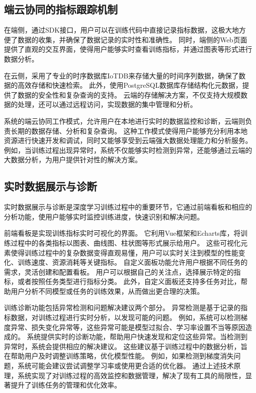 \subsection{端云协同的指标跟踪机制}

在端侧，通过SDK接口，用户可以在训练代码中直接记录指标数据，这极大地方便了数据的收集，并确保了数据记录的实时性和准确性。
同时，端侧的Web页面提供了直观的交互界面，使得用户能够实时查看训练指标，并通过图表等形式进行数据分析。

在云侧，采用了专业的时序数据库IoTDB来存储大量的时间序列数据，确保了数据的高效存储和快速检索。
此外，使用PostgreSQL数据库存储结构化元数据，提供了数据的安全性和复杂查询的支持。
云端的存储解决方案，不仅支持大规模数据的处理，还可以通过远程访问，实现数据的集中管理和分析。

系统的端云协同工作模式，允许用户在本地进行实时的数据监控和诊断，云端则负责长期的数据存储、分析和复杂查询。
这种工作模式使得用户能够充分利用本地资源进行快速开发和调试，同时又能够享受到云端强大数据处理能力和分析服务。
例如，当训练过程出现异常时，系统不仅能够实时检测到异常，还能够通过云端的大数据分析，为用户提供针对性的解决方案。

\subsection{实时数据展示与诊断}

实时数据展示与诊断是深度学习训练过程中的重要环节，它通过前端看板和相应的分析功能，使用户能够实时监控训练进度，快速识别和解决问题。

前端看板是实现训练指标实时可视化的界面。
它利用Vue框架和Echarts库，将训练过程中的各类指标以图表、曲线图、柱状图等形式展示给用户。
这些可视化元素使得训练过程中的复杂数据变得直观易懂，用户可以实时关注到模型的性能变化、训练速度、资源消耗等关键指标。
自定义面板功能允许用户根据不同任务的需求，灵活创建和配置看板。
用户可以根据自己的关注点，选择展示特定的指标，或者按照任务类型进行指标分类。
此外，自定义面板还支持多任务对比，帮助用户分析不同模型或任务的训练效果，从而做出更合理的决策。

训练诊断功能包括异常检测和问题解决建议两个部分。
异常检测是基于记录的指标数据，对训练过程进行实时分析，以发现可能的问题。
例如，系统可以检测梯度异常、损失变化异常等，这些异常可能是模型过拟合、学习率设置不当等原因造成的。
系统提供实时的诊断功能，帮助用户快速发现和定位这些异常。当检测到异常时，系统会提供相应的解决建议。
这些建议基于训练过程中的数据分析，旨在帮助用户及时调整训练策略，优化模型性能。
例如，如果检测到梯度消失问题，系统可能会建议尝试调整学习率或使用更合适的优化器。
通过上述技术原理，系统实现了对训练过程的高效监控和数据管理，解决了现有工具的局限性，显著提升了训练任务的管理和优化效率。


